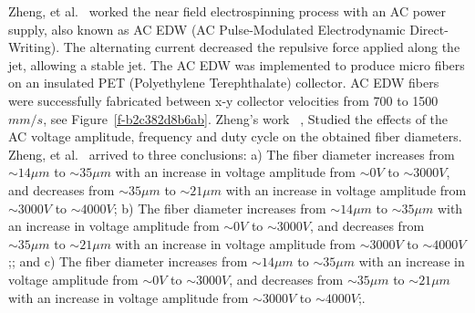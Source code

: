 \documentclass[5p,,preprint,12pt,twocolumn]{elsarticle}
\begin{document}
Zheng, et al.\unskip~\cite{527120:11974328} worked the near field electrospinning process with an AC power supply, also known as AC EDW (AC Pulse-Modulated Electrodynamic Direct-Writing). The alternating current decreased the repulsive force applied along the jet, allowing a stable jet. The AC EDW was implemented to produce micro fibers on an insulated PET (Polyethylene Terephthalate) collector. AC EDW fibers were successfully fabricated between x-y collector velocities from 700 to 1500 $mm / s $, see Figure~\ref{f-b2c382d8b6ab}. Zheng's work \unskip~\cite{527120:11974328}, Studied the effects of the AC voltage amplitude, frequency and duty cycle on the obtained fiber diameters. Zheng, et al.\unskip~\cite{527120:11974328} arrived to three conclusions: a) The fiber diameter increases from $\sim 14 \mu m $ to $\sim 35 \mu m $ with an increase in voltage amplitude from $\sim0V $ to $\sim 3000 V $, and decreases from $\sim 35 \mu m $ to $\sim 21 \mu m $ with an increase in voltage amplitude from $\sim 3000 V $ to $\sim 4000 V $; b) The fiber diameter increases from $\sim 14 \mu m $ to $\sim 35 \mu m $ with an increase in voltage amplitude from $\sim0V $ to $\sim 3000 V $, and decreases from $\sim 35 \mu m $ to $\sim 21 \mu m $ with an increase in voltage amplitude from $\sim 3000 V $ to $\sim 4000 V $;; and c) The fiber diameter increases from $\sim 14 \mu m $ to $\sim 35 \mu m $ with an increase in voltage amplitude from $\sim0V $ to $\sim 3000 V $, and decreases from $\sim 35 \mu m $ to $\sim 21 \mu m $ with an increase in voltage amplitude from $\sim 3000 V $ to $\sim 4000 V $;.
\end{document}
